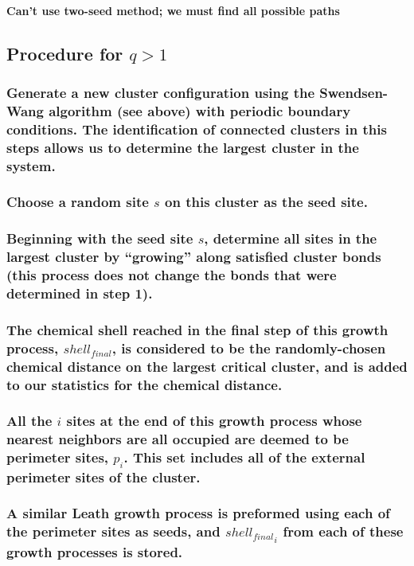 \documentclass[pre,preprint]{revtex4-1}
\begin{document}
\paragraph{Can't use two-seed method; we must find all possible paths}
\label{sec-2.2.3.1}
\subsection{Procedure for $q>1$}
\label{sec-2.3}
\subsubsection{Generate a new cluster configuration using the Swendsen-Wang algorithm (see above) with periodic boundary conditions. The identification of connected clusters in this steps allows us to determine the largest cluster in the system.}
\label{sec-2.3.1}
\subsubsection{Choose a random site $s$ on this cluster as the seed site.}
\label{sec-2.3.2}
\subsubsection{Beginning with the seed site $s$, determine all sites in the largest cluster by ``growing'' along satisfied cluster bonds (this process does not change the bonds that were determined in step 1).}
\label{sec-2.3.3}
\subsubsection{The chemical shell reached in the final step of this growth process, $shell_{final}$, is considered to be the randomly-chosen chemical distance on the largest critical cluster, and is added to our statistics for the chemical distance.}
\label{sec-2.3.4}
\subsubsection{All the $i$ sites at the end of this growth process whose nearest neighbors are all occupied are deemed to be perimeter sites, $p_i$.  This set includes all of the external perimeter sites of the cluster.}
\label{sec-2.3.5}
\subsubsection{A similar Leath growth process is preformed using each of the perimeter sites as seeds, and ${shell_{final}}_i$ from each of these growth processes is stored.}
\label{sec-2.3.6}
\end{document}
